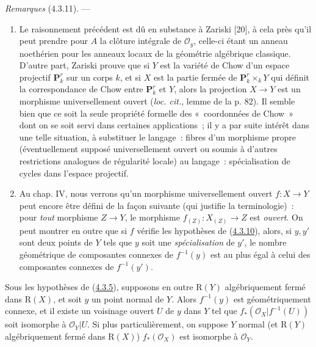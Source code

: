 \begin{env}[4.3.11]
\label{III.4.3.11-fr}
\emph{Remarques} (4.3.11). ---
\begin{enumerate}
\item[(i)] Le raisonnement précédent est dû en substance à Zariski [20], à
cela près qu'il peut prendre pour $A$ la clôture intégrale de
$\mathcal O_y$, celle-ci étant un anneau noethérien pour les anneaux locaux
de la géométrie algébrique classique. D'autre part, Zariski prouve que si
$Y$ est la variété de Chow d'un espace projectif $\mathbf P_k^r$ sur un
corps $k$, et si $X$ est la partie fermée de $\mathbf P_k^r\times_kY$ qui
définit la correspondance de Chow entre $\mathbf P_k^r$ et $Y$, alors la
projection $X\to Y$ est un morphisme universellement ouvert
(\emph{loc. cit.}, lemme de la p. 82). Il semble bien que ce soit la seule
propriété formelle des «~coordonnées de Chow~» dont on se soit servi dans
certaines applications~; il y a par suite intérêt dans une telle situation,
à substituer le langage~: fibres d'un morphisme propre (éventuellement
supposé universellement ouvert ou soumis à d'autres restrictions analogues
de régularité locale) au langage~: spécialisation de cycles dans l'espace
projectif.

\item[(ii)] Au chap. IV, nous verrons qu'un morphisme universellement ouvert
$f:X\to Y$ peut encore être défini de la façon suivante (qui justifie la
terminologie)~: pour \emph{tout} morphisme $Z\to Y$, le morphisme
$f_{(Z)}:X_{(Z)}\to Z$ est \emph{ouvert}. On peut montrer en outre que si $f$
vérifie les hypothèses de (\hyperref[III.4.3.10-fr]{4.3.10}), alors, si
$y,y'$ sont deux points de $Y$ tels que $y$ soit une \emph{spécialisation} de $y'$,
le nombre géométrique de composantes connexes de $f^{-1}(y)$ est au plus
égal à celui des composantes connexes de $f^{-1}(y')$.
\end{enumerate}
\end{env}

\begin{corollary}[4.3.12]
\label{III.4.3.12-fr}
Sous les hypothèses de \textup{(\hyperref[III.4.3.5-fr]{4.3.5})}, supposons en outre
$\mathrm R(Y)$ algébriquement fermé dans $\mathrm R(X)$, et soit $y$ un
point normal de $Y$. Alors $f^{-1}(y)$ est géométriquement connexe, et il
existe un voisinage ouvert $U$ de $y$ dans $Y$ tel que
$f_*(\mathcal O_X|f^{-1}(U))$ soit isomorphe à $\mathcal O_Y|U$. Si plus
particulièrement, on suppose $Y$ normal (et $\mathrm R(Y)$ algébriquement
fermé dans $\mathrm R(X)$) $f_*(\mathcal O_X)$ est isomorphe à
$\mathcal O_Y$.
\end{corollary}

